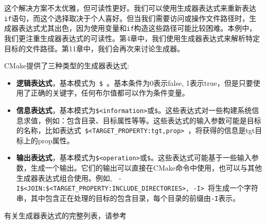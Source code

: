 这个解决方案不太优雅，但可读性更好。我们可以使用生成器表达式来重新表达\texttt{if}语句，而这个选择取决于个人喜好。但当我们需要访问或操作文件路径时，生成器表达式尤其出色，因为使用变量和\texttt{if}构造这些路径可能比较困难。本例中，我们更注重生成器表达式的可读性。第4章中，我们使用生成器表达式来解析特定目标的文件路径。第11章中，我们会再次来讨论生成器。


CMake提供了三种类型的生成器表达式:

\begin{itemize}
\item \textbf{逻辑表达式}，基本模式为\texttt{ \$<condition:outcome> }。基本条件为0表示false, 1表示true，但是只要使用了正确的关键字，任何布尔值都可以作为条件变量。

\item \textbf{信息表达式}，基本模式为\texttt{\$<information>}或\texttt{\$<information:input>}。这些表达式对一些构建系统信息求值，例如：包含目录、目标属性等等。这些表达式的输入参数可能是目标的名称，比如表达式\texttt{ \$<TARGET\_PROPERTY:tgt,prop> }，将获得的信息是tgt目标上的prop属性。

\item \textbf{输出表达式}，基本模式为\texttt{\$<operation>}或\texttt{\$<operation:input>}。这些表达式可能基于一些输入参数，生成一个输出。它们的输出可以直接在CMake命令中使用，也可以与其他生成器表达式组合使用。例如, \texttt{ - I\$<JOIN:\$<TARGET\_PROPERTY:INCLUDE\_DIRECTORIES>, -I> }将生成一个字符串，其中包含正在处理的目标的包含目录，每个目录的前缀由\texttt{-I}表示。

\end{itemize}

有关生成器表达式的完整列表，请参考


